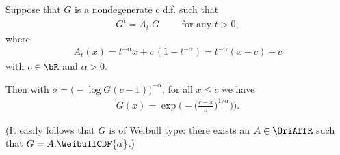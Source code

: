 \begin{lemma}
  \label{lem:characterization-self-similar-family-neg-index}
  \leanok
  Suppose that $G$ is a nondegenerate c.d.f. such that
  \begin{align*}
    G^{t} = A_t . G \qquad \text{ for any } t > 0 ,
  \end{align*}
  where
  \begin{align*}
    A_t(x) = t^{-\alpha} x + c \, (1 - t^{-\alpha}) = t^{-\alpha} (x-c) + c
  \end{align*}
  with $c \in \bR$ and $\alpha > 0$.

  Then with $\sigma = \big(- \log G(c-1)\big)^{-\alpha}$,
  for all $x \le c$ we have
  \begin{align*}
    G(x) = \exp \Big( - \big( \frac{c - x}{\sigma} \big)^{1/\alpha} \big) \Big) .
  \end{align*}

  (It easily follows that $G$ is of Weibull type: there exists
  an $A \in \OriAffR$ such that $G = A.\WeibullCDF{\alpha}$.)
\end{lemma}
